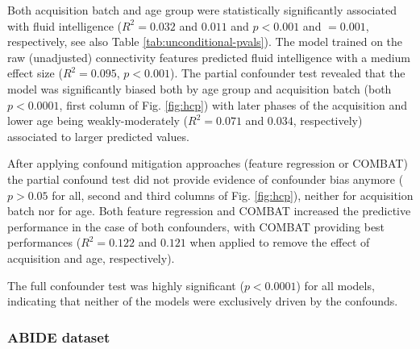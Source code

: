 \documentclass{article}
\begin{document}
Both acquisition batch and age group were statistically significantly associated with fluid intelligence ($R^2=0.032$ and $0.011$ and $p<0.001$ and $=0.001$, respectively, see also Table \ref{tab:unconditional-pvals}). The model trained on the raw (unadjusted) connectivity features predicted fluid intelligence with a medium effect size ($R^2=0.095$, $p<0.001$).
The partial confounder test revealed that the model was significantly biased both by age group and acquisition batch (both $p<0.0001$, first column of Fig. \ref{fig:hcp}) with later phases of the acquisition and lower age being weakly-moderately ($R^2=0.071$ and $0.034$, respectively) associated to larger predicted values.

After applying confound mitigation approaches (feature regression or COMBAT) the partial confound test did not provide evidence of confounder bias anymore ($p > 0.05$ for all, second and third columns of Fig. \ref{fig:hcp}), neither for acquisition batch nor for age. Both feature regression and COMBAT increased the predictive performance in the case of both confounders, with COMBAT providing best performances ($R^2=0.122$ and $0.121$ when applied to remove the effect of acquisition and age, respectively).

The full confounder test was highly significant ($p<0.0001$) for all models, indicating that neither of the models were exclusively driven by the confounds.

\subsubsection*{ABIDE dataset}
\end{document}

